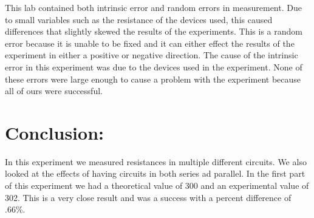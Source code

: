 \documentclass{article}
\begin{document}
This lab contained both intrinsic error and random errors in measurement.  Due to small variables such as the resistance of the devices used, this caused differences that slightly skewed the results of the experiments.  This is a random error because it is unable to be fixed and it can either effect the results of the experiment in either a positive or negative direction.  The cause of the intrinsic error in this experiment was due to the devices used in the experiment.  None of these errors were large enough to cause a problem with the experiment because all of ours were successful.  

  
  


\singlespace
\newpage

\section*{Conclusion:}
In this experiment we measured resistances in multiple different circuits.  We also looked at the effects of having circuits in both series ad parallel.  In the first part of this experiment we had a theoretical value of 300 and an experimental value of 302.  This is a very close result and was a success with a percent difference of .66\%.
\end{document}

